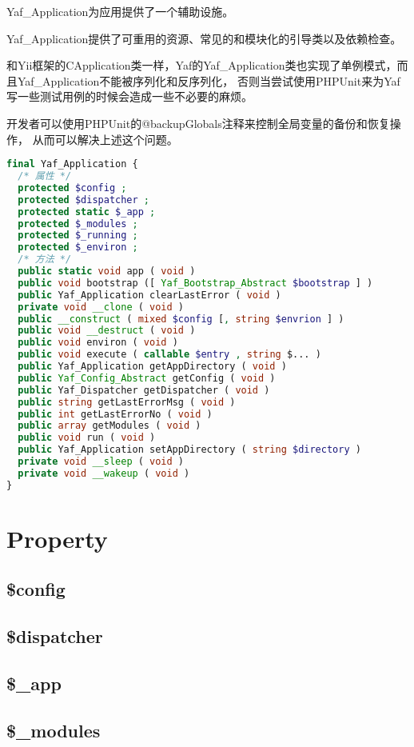 Yaf\_Application为应用提供了一个辅助设施。

Yaf\_Application提供了可重用的资源、常见的和模块化的引导类以及依赖检查。

和Yii框架的CApplication类一样，Yaf的Yaf\_Application类也实现了单例模式，而且Yaf\_Application不能被序列化和反序列化， 否则当尝试使用PHPUnit来为Yaf写一些测试用例的时候会造成一些不必要的麻烦。

开发者可以使用PHPUnit的@backupGlobals注释来控制全局变量的备份和恢复操作， 从而可以解决上述这个问题。




\begin{lstlisting}[language=PHP]
final Yaf_Application {
  /* 属性 */
  protected $config ;
  protected $dispatcher ;
  protected static $_app ;
  protected $_modules ;
  protected $_running ;
  protected $_environ ;
  /* 方法 */
  public static void app ( void )
  public void bootstrap ([ Yaf_Bootstrap_Abstract $bootstrap ] )
  public Yaf_Application clearLastError ( void )
  private void __clone ( void )
  public __construct ( mixed $config [, string $envrion ] )
  public void __destruct ( void )
  public void environ ( void )
  public void execute ( callable $entry , string $... )
  public Yaf_Application getAppDirectory ( void )
  public Yaf_Config_Abstract getConfig ( void )
  public Yaf_Dispatcher getDispatcher ( void )
  public string getLastErrorMsg ( void )
  public int getLastErrorNo ( void )
  public array getModules ( void )
  public void run ( void )
  public Yaf_Application setAppDirectory ( string $directory )
  private void __sleep ( void )
  private void __wakeup ( void )
}
\end{lstlisting}

\section{Property}


\subsection{\$config}
\subsection{\$dispatcher}
\subsection{\$\_app}
\subsection{\$\_modules}
